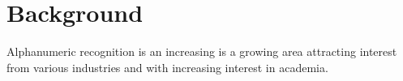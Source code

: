 \section{Background}

Alphanumeric recognition is an increasing  is a growing area attracting interest from various industries and with increasing interest in academia. %
